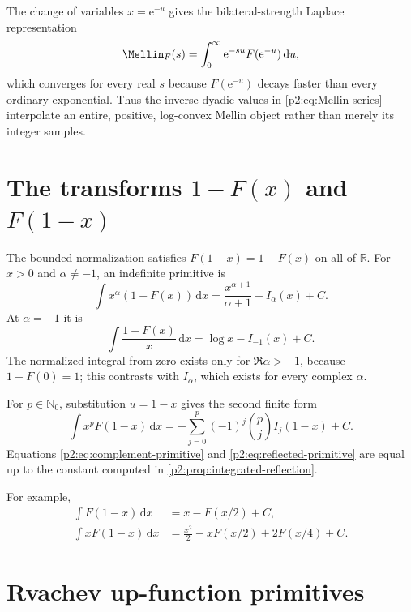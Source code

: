 \documentclass[11pt,oneside]{article}
\theoremstyle{definition}
\theoremstyle{remark}
\newcommand{\R}{\mathbb R}
\newcommand{\N}{\mathbb N}
\newcommand{\dd}{\,\mathrm d}
\newcommand{\e}{\mathrm e}
\newcommand{\1}{\mathbf 1}
\begin{document}
The change of variables $x=\e^{-u}$ gives the bilateral-strength Laplace
representation
\begin{equation}
 \Mellin_F(s)=\int_0^\infty\e^{-su}F(\e^{-u})\dd u,       \label{p2:eq:Mellin-Laplace}
\end{equation}
which converges for every real $s$ because $F(\e^{-u})$ decays faster than every
ordinary exponential.  Thus the inverse-dyadic values in
\eqref{p2:eq:Mellin-series} interpolate an entire, positive, log-convex Mellin
object rather than merely its integer samples.

\section{\texorpdfstring{The transforms $1-F(x)$ and $F(1-x)$}{The transforms 1-F(x) and F(1-x)}}
\label{p2:sec:transforms}

The bounded normalization satisfies $F(1-x)=1-F(x)$ on all of $\R$.
For $x>0$ and $\alpha\ne-1$, an indefinite primitive is
\begin{equation}
 \boxed{
 \int x^\alpha(1-F(x))\dd x
 =\frac{x^{\alpha+1}}{\alpha+1}-I_\alpha(x)+C.}            \label{p2:eq:complement-primitive}
\end{equation}
At $\alpha=-1$ it is
\begin{equation}
 \int\frac{1-F(x)}x\dd x=\log x-I_{-1}(x)+C.             \label{p2:eq:complement-minus-one}
\end{equation}
The normalized integral from zero exists only for $\Re\alpha>-1$, because
$1-F(0)=1$; this contrasts with $I_\alpha$, which exists for every complex
$\alpha$.

For $p\in\N_0$, substitution $u=1-x$ gives the second finite form
\begin{equation}
 \boxed{
 \int x^pF(1-x)\dd x
 =-\sum_{j=0}^{p}(-1)^j\binom pj I_j(1-x)+C.}              \label{p2:eq:reflected-primitive}
\end{equation}
Equations \eqref{p2:eq:complement-primitive} and
\eqref{p2:eq:reflected-primitive} are equal up to the constant computed in
\cref{p2:prop:integrated-reflection}.

For example,
\begin{align}
 \int F(1-x)\dd x&=x-F(x/2)+C,                             \label{p2:eq:reflect-p0}\\
 \int xF(1-x)\dd x&=\frac{x^2}{2}-xF(x/2)+2F(x/4)+C.      \label{p2:eq:reflect-p1}
\end{align}

\section{Rvachev up-function primitives}
\label{p2:sec:up}
\end{document}
